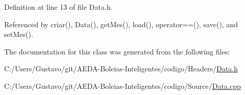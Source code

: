 Definition at line 13 of file Data.\+h.



Referenced by criar(), Data(), get\+Mes(), load(), operator==(), save(), and set\+Mes().



The documentation for this class was generated from the following files\+:\begin{DoxyCompactItemize}
\item 
C\+:/\+Users/\+Gustavo/git/\+A\+E\+D\+A-\/\+Boleias-\/\+Inteligentes/codigo/\+Headers/\hyperlink{_data_8h}{Data.\+h}\item 
C\+:/\+Users/\+Gustavo/git/\+A\+E\+D\+A-\/\+Boleias-\/\+Inteligentes/codigo/\+Source/\hyperlink{_data_8cpp}{Data.\+cpp}\end{DoxyCompactItemize}
